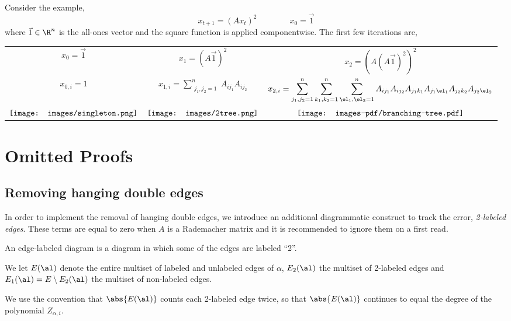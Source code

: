 \documentclass[12pt]{article}
\begin{document}
\begin{example}
Consider the example,
\[x_{t+1} = (Ax_t)^2 \qquad\qquad x_0 = \vec{1}\]
where $\vec{1} \in \R^n$ is the all-ones vector and the square function
is applied componentwise.
The first few iterations are,
    \begin{center}
    \begin{tabular}{c|c|c}
        $x_0 = \vec{1}$ & $x_1 = (A\vec{1})^2$ & $x_2 = (A(A\vec{1})^2)^2$\\
        $x_{0,i} = 1$ & $\displaystyle x_{1,i} = \sum_{\substack{j_1, j_2 = 1}}^n A_{ij_1}A_{ij_2}$ & $\displaystyle  x_{2,i} = \sum_{j_1,j_2 = 1}^n \sum_{k_1, k_2 = 1}^n\sum_{\el_1,\el_2 = 1}^n A_{ij_1}A_{ij_2} A_{j_1k_1} A_{j_1\el_1} A_{j_2k_2}A_{j_2\el_2}$\\
        $\vcenter{\hbox{\texttt{[image: images/singleton.png]}}}$& $\vcenter{\hbox{\texttt{[image: images/2tree.png]}}}$ & $\vcenter{\hbox{\texttt{[image: images-pdf/branching-tree.pdf]}}}$
    \end{tabular}
    \end{center}
\end{example}
 

\section{Omitted Proofs}
\label{app:non-asymptotic-analysis}


\subsection{Removing hanging double edges}
\label{sec:edge-labels}

In order to implement the removal of hanging double edges, we introduce
an additional diagrammatic construct to track the error,
\emph{2-labeled edges}.
These terms are equal to zero when $A$ is a Rademacher matrix
and it is recommended to ignore them on a first read.


\begin{definition}
    \label{def:labeled-diagram}
    An edge-labeled diagram is a diagram in which some of the edges
    are labeled ``2''.

    We let $E(\al)$ denote the entire multiset of labeled and unlabeled edges of $\alpha$, $E_2(\al)$
    the multiset of 2-labeled edges and $E_1(\al)=E\setminus E_2(\al)$ the multiset of non-labeled edges.

    We use the convention that $\abs{E(\al)}$ counts each 2-labeled edge
twice, so that $\abs{E(\al)}$ continues to equal the degree of the polynomial $Z_{\alpha,i}$.
\end{definition}
\end{document}
